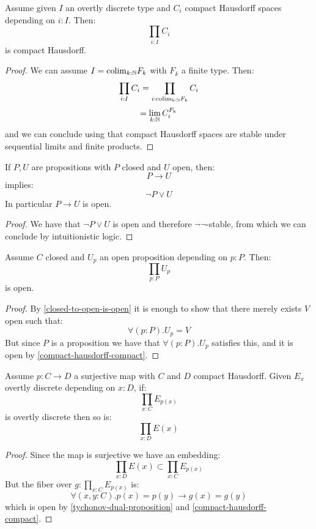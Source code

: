 \begin{theorem}[Tychonov]
Assume given $I$ an overtly discrete type and $C_i$ compact Hausdorff spaces depending on $i:I$. Then:
\[\prod_{i:I}C_i\]
is compact Hausdorff.
\end{theorem}

\begin{proof}
We can assume $I = \mathrm{colim}_{k:\mathbb{N}} F_k$ with $F_k$ a finite type. Then:
\[\prod_{i:I}C_i = \prod_{i:\mathrm{colim}_{k:\mathbb{N}} F_k} C_i\]
\[= \lim_{k:\mathbb{N}} C_i^{F_k}\]
and we can conclude using that compact Hausdorff spaces are stable under sequential limits and finite products.
\end{proof}

\begin{lemma}\label{closed-to-open-is-open}
If $P,U$ are propositions with $P$ closed and $U$ open, then:
\[P\to U\]
implies:
\[\neg P \lor U\]
In particular $P\to U$ is open.
\end{lemma}

\begin{proof}
We have that $\neg P\lor U$ is open and therefore $\neg\neg$-stable, from which we can conclude by intuitionistic logic.
\end{proof}

\begin{lemma}\label{tychonov-dual-proposition}
Assume $C$ closed and $U_p$ an open proposition depending on $p:P$. Then:
\[\prod_{p:P}U_p\]
is open.
\end{lemma}

\begin{proof}
By \cref{closed-to-open-is-open} it is enough to show that there merely exists $V$ open such that:
\[\forall (p:P). U_p = V\]
But since $P$ is a proposition we have that $\forall(p:P). U_p$ satisfies this, and it is open by \cref{compact-hausdorff-compact}.
\end{proof}

\begin{lemma}\label{tychonov-dual-auxiliary}
Assume $p:C\to D$ a surjective map with $C$ and $D$ compact Hausdorff. Given $E_x$ overtly discrete depending on $x:D$, if:
\[\prod_{x:C}E_{p(x)}\]
is overtly discrete then so is:
\[\prod_{x:D}E(x)\]
\end{lemma}

\begin{proof}
Since the map is surjective we have an embedding:
\[\prod_{x:D}E(x)\subset \prod_{x:C}E_{p(x)}\]
But the fiber over $g:\prod_{x:C}E_{p(x)}$ is:
\[\forall (x,y:C). p(x)=p(y) \to g(x)=g(y)\]
which is open by \cref{tychonov-dual-proposition} and \cref{compact-hausdorff-compact}.
\end{proof}

